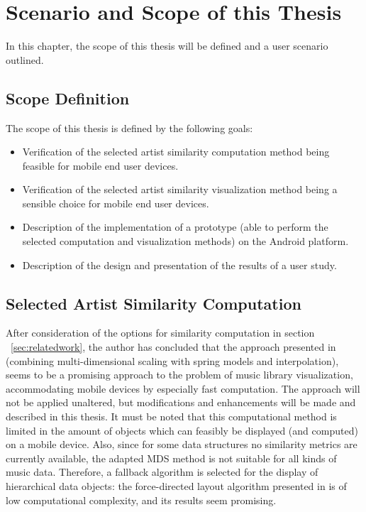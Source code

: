\section{Scenario and Scope of this Thesis}
\label{sec:scenario}

In this chapter, the scope of this thesis will be defined and a user scenario outlined. 

\subsection{Scope Definition}

The scope of this thesis is defined by the following goals: 

\begin{itemize}
	\item Verification of the selected artist similarity computation method being feasible for mobile end user devices.
	\item Verification of the selected artist similarity visualization method being a sensible choice for mobile end user devices.
	\item Description of the implementation of a prototype (able to perform the selected computation and visualization methods) on the Android platform.
	\item Description of the design and presentation of the results of a user study.
\end{itemize}


\subsection{Selected Artist Similarity Computation}

After consideration of the options for similarity computation in section ~\ref{sec:relatedwork}, the author has concluded that the approach presented in \cite{Morrison:2003:FMS} (combining multi-dimensional scaling with spring models and interpolation), seems to be a promising approach to the problem of music library visualization, accommodating mobile devices by especially fast computation. The approach will not be applied unaltered, but modifications and enhancements will be made and described in this thesis. 
It must be noted that this computational method is limited in the amount of objects which can feasibly be displayed (and computed) on a mobile device. Also, since for some data structures no similarity metrics are currently available, the adapted MDS method is not suitable for all kinds of music data. Therefore, a fallback algorithm is selected for the display of hierarchical data objects: the force-directed layout algorithm presented in \cite{Kobourov04} is of low computational complexity, and its results seem promising.

